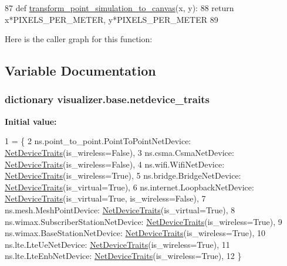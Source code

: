 \begin{DoxyCode}
87 \textcolor{keyword}{def }\hyperlink{namespacevisualizer_1_1base_af541810b290cffa16a241008ddaec285}{transform\_point\_simulation\_to\_canvas}(x, y):
88     \textcolor{keywordflow}{return} x*PIXELS\_PER\_METER, y*PIXELS\_PER\_METER
89 
\end{DoxyCode}


Here is the caller graph for this function\+:




\subsection{Variable Documentation}
\subsubsection[{\texorpdfstring{netdevice\+\_\+traits}{netdevice_traits}}]{\setlength{\rightskip}{0pt plus 5cm}dictionary visualizer.\+base.\+netdevice\+\_\+traits}\hypertarget{namespacevisualizer_1_1base_a1f2408e853bc294e15d23933980b15bf}{}\label{namespacevisualizer_1_1base_a1f2408e853bc294e15d23933980b15bf}
{\bfseries Initial value\+:}
\begin{DoxyCode}
1 = \{
2     ns.point\_to\_point.PointToPointNetDevice: \hyperlink{classvisualizer_1_1base_1_1NetDeviceTraits}{NetDeviceTraits}(is\_wireless=\textcolor{keyword}{False}),
3     ns.csma.CsmaNetDevice: \hyperlink{classvisualizer_1_1base_1_1NetDeviceTraits}{NetDeviceTraits}(is\_wireless=\textcolor{keyword}{False}),
4     ns.wifi.WifiNetDevice: \hyperlink{classvisualizer_1_1base_1_1NetDeviceTraits}{NetDeviceTraits}(is\_wireless=\textcolor{keyword}{True}),
5     ns.bridge.BridgeNetDevice: \hyperlink{classvisualizer_1_1base_1_1NetDeviceTraits}{NetDeviceTraits}(is\_virtual=\textcolor{keyword}{True}),
6     ns.internet.LoopbackNetDevice: \hyperlink{classvisualizer_1_1base_1_1NetDeviceTraits}{NetDeviceTraits}(is\_virtual=\textcolor{keyword}{True}, is\_wireless=\textcolor{keyword}{False}),
7     ns.mesh.MeshPointDevice: \hyperlink{classvisualizer_1_1base_1_1NetDeviceTraits}{NetDeviceTraits}(is\_virtual=\textcolor{keyword}{True}),
8     ns.wimax.SubscriberStationNetDevice: \hyperlink{classvisualizer_1_1base_1_1NetDeviceTraits}{NetDeviceTraits}(is\_wireless=\textcolor{keyword}{True}),
9     ns.wimax.BaseStationNetDevice: \hyperlink{classvisualizer_1_1base_1_1NetDeviceTraits}{NetDeviceTraits}(is\_wireless=\textcolor{keyword}{True}),
10     ns.lte.LteUeNetDevice: \hyperlink{classvisualizer_1_1base_1_1NetDeviceTraits}{NetDeviceTraits}(is\_wireless=\textcolor{keyword}{True}),
11     ns.lte.LteEnbNetDevice: \hyperlink{classvisualizer_1_1base_1_1NetDeviceTraits}{NetDeviceTraits}(is\_wireless=\textcolor{keyword}{True}),
12 \}
\end{DoxyCode}
